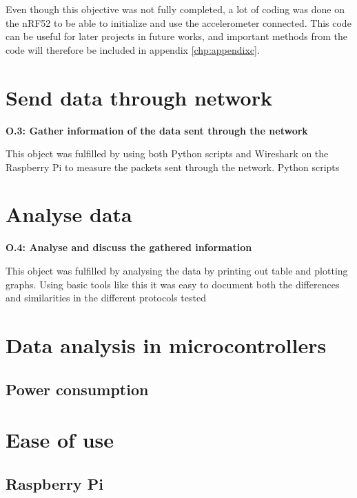 Even though this objective was not fully completed, a lot of coding was done on the nRF52 to be able to initialize and use the accelerometer connected. This code can be useful for later projects in future works, and important methods from the code will therefore be included in appendix \ref{chp:appendixc}.  

\section{Send data through network}

\noindent\textbf{O.3: Gather information of the data sent through the network}

This object was fulfilled by using both Python scripts and Wireshark on the Raspberry Pi to measure the packets sent through the network. Python scripts 

\section{Analyse data}

\noindent\textbf{O.4: Analyse and discuss the gathered information}

This object was fulfilled by analysing the data by printing out table and plotting graphs. Using basic tools like this it was easy to document both the differences and similarities in the different protocols tested 






\section{Data analysis in microcontrollers}



\subsection{Power consumption}



\section{Ease of use}


\subsection{Raspberry Pi}



